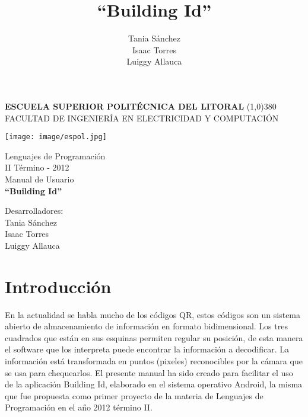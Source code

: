 \documentclass[a4paper,11pt]{article}
\title{``Building Id''}
\author{Tania S\'{a}nchez\\  Isaac Torres  \\Luiggy Allauca}
\begin{document}
\setlength{\topmargin}{0.5in}
			\pagestyle{empty}
			\begin{center}
				\textbf{
					\vspace{-0.7em}
					ESCUELA SUPERIOR POLIT\'{E}CNICA DEL LITORAL
				}
				\line(1,0){380}\\		
				\scriptsize{FACULTAD DE INGENIER\'{I}A EN ELECTRICIDAD Y COMPUTACI\'{O}N}
				
				\vspace{2.5em}
				\texttt{[image: image/espol.jpg]} 
			\end{center}
			
			\begin{center}
				\vspace{2.5em}
				Lenguajes de Programaci\'{o}n
				\\II T\'{e}rmino - 2012
				\vspace{1.5em}  %
				\\Manual de Usuario \\
				\vspace{5em}
				\Huge{\textbf{``Building Id''	\vspace{3em}}}
			\end{center}	
			
			


				\hspace*{5cm}Desarrolladores:
				\vspace{1.5em}
				\\\hspace*{8cm}Tania S\'{a}nchez
				\\\hspace*{8cm}Isaac Torres
				\\\hspace*{8cm}Luiggy Allauca


\newpage 

\setlength{\topmargin}{-0,2in}
\tableofcontents

\newpage 


\section{Introducci\'{o}n}
En la actualidad se habla mucho de los c\'{o}digos QR, estos c\'{o}digos son un sistema abierto de almacenamiento de informaci\'{o}n en formato bidimensional. Los tres cuadrados que est\'{a}n en sus esquinas permiten regular su posici\'{o}n, de esta manera el software que los interpreta puede encontrar la informaci\'{o}n a decodificar. La informaci\'{o}n est\'{a} transformada en puntos (pixeles) reconocibles por la c\'{a}mara que se usa para chequearlos.
\newline
\newline
El presente manual ha sido creado para facilitar el uso de la aplicaci\'{o}n Building Id, elaborado en el sistema operativo Android, la misma que fue propuesta como primer proyecto de la materia de Lenguajes de Programaci\'{o}n en el a\H{n}o 2012 t\'{e}rmino II.
\newline
\newline
\end{document}
